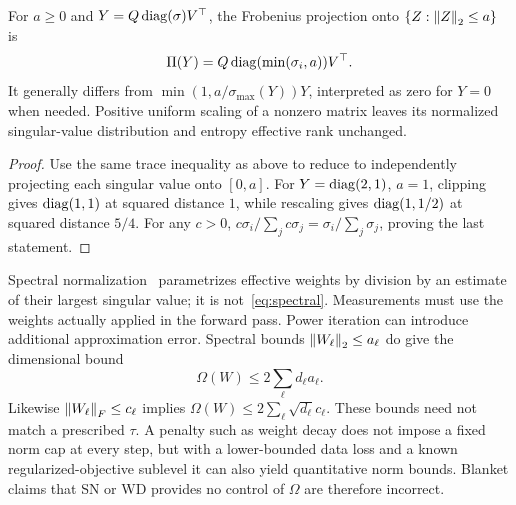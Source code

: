 \begin{proposition}\label{prop:spectral}
For $a\ge0$ and $Y=Q\operatorname{diag}(\sigma)V^\top$, the Frobenius projection onto $\{Z:\left\lVert Z\right\rVert_2\le a\}$ is
\begin{equation}\label{eq:spectral}
 \Pi(Y)=Q\operatorname{diag}(\min(\sigma_i,a))V^\top.
\end{equation}
It generally differs from $\min(1,a/\sigma_{\max}(Y))Y$, interpreted as zero for $Y=0$ when needed. Positive uniform scaling of a nonzero matrix leaves its normalized singular-value distribution and entropy effective rank unchanged.
\end{proposition}
\begin{proof}
Use the same trace inequality as above to reduce to independently projecting each singular value onto $[0,a]$. For $Y=\operatorname{diag}(2,1)$, $a=1$, clipping gives $\operatorname{diag}(1,1)$ at squared distance $1$, while rescaling gives $\operatorname{diag}(1,1/2)$ at squared distance $5/4$. For any $c>0$, $c\sigma_i/\sum_j c\sigma_j=\sigma_i/\sum_j\sigma_j$, proving the last statement.
\end{proof}
Spectral normalization~\cite{Miyato2018SpectralNorm} parametrizes effective weights by division by an estimate of their largest singular value; it is not~\eqref{eq:spectral}. Measurements must use the weights actually applied in the forward pass. Power iteration can introduce additional approximation error. Spectral bounds $\left\lVert W_\ell\right\rVert_2\le a_\ell$ do give the dimensional bound
\[
 \Omega(W)\le2\sum_\ell d_\ell a_\ell.
\]
Likewise $\left\lVert W_\ell\right\rVert_F\le c_\ell$ implies $\Omega(W)\le2\sum_\ell\sqrt{d_\ell}c_\ell$. These bounds need not match a prescribed $\tau$. A penalty such as weight decay does not impose a fixed norm cap at every step, but with a lower-bounded data loss and a known regularized-objective sublevel it can also yield quantitative norm bounds. Blanket claims that SN or WD provides no control of $\Omega$ are therefore incorrect.

